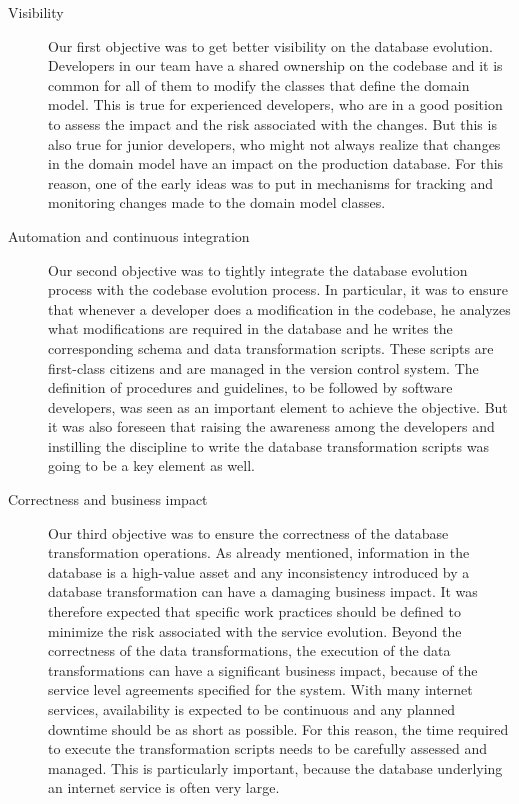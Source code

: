 \begin{description}
\item[Visibility] Our first objective was to get better visibility on the database evolution. Developers in our team have a shared ownership on the codebase and it is common for all of them to modify the classes that define the domain model. This is true for experienced developers, who are in a good position to assess the impact and the risk associated with the changes. But this is also true for junior developers, who might not always realize that changes in the domain model have an impact on the production database. For this reason, one of the early ideas was to put in mechanisms for tracking and monitoring changes made to the domain model classes. 

\item[Automation and continuous integration] Our second objective was to tightly integrate the database evolution process with the codebase evolution process. In particular, it was to ensure that whenever a developer does a modification in the codebase, he analyzes what modifications are required in the database and he writes the corresponding schema and data transformation scripts. These scripts are first-class citizens and are managed in the version control system. The definition of procedures and guidelines, to be followed by software developers, was seen as an important element to achieve the objective. But it was also foreseen that raising the awareness among the developers and instilling the discipline to write the database transformation scripts was going to be a key element as well.

\item [Correctness and business impact] Our third objective was to ensure the correctness of the database transformation operations. As already mentioned, information in the database is a high-value asset and any inconsistency introduced by a database transformation can have a damaging business impact. It was therefore expected that specific work practices should be defined to minimize the risk associated with the service evolution. Beyond the correctness of the data transformations, the execution of the data transformations can have a significant business impact, because of the service level agreements specified for the system. With many internet services, availability is expected to be continuous and any planned downtime should be as short as possible. For this reason, the time required to execute the transformation scripts needs to be carefully assessed and managed. This is particularly important, because the database underlying an internet service is often very large.

\end{description}


